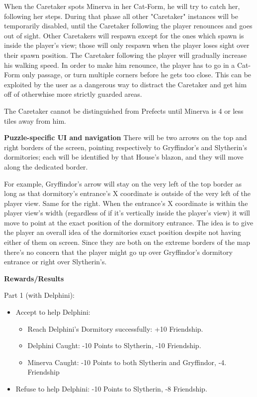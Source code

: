 When the Caretaker spots Minerva in her Cat-Form, he will try to catch her, following her steps. During that phase all other "Caretaker" instances will be temporarily disabled, until the Caretaker following the player renounces and goes out of sight. Other Caretakers will respawn except for the ones which spawn is inside the player's view; those will only respawn when the player loses sight over their spawn position. The Caretaker following the player will gradually increase his walking speed. In order to make him renounce, the player has to go in a Cat-Form only passage, or turn multiple corners before he gets too close. This can be exploited by the user as a dangerous way to distract the Caretaker and get him off of otherwhise more strictly guarded areas.

The Caretaker cannot be distinguished from Prefects until Minerva is 4 or less tiles away from him.

\textbf{Puzzle-specific UI and navigation}
There will be two arrows on the top and right borders of the screen, pointing respectively to Gryffindor's and Slytherin's dormitories; each will be identified by that House's blazon, and they will move along the dedicated border.

For example, Gryffindor's arrow will stay on the very left of the top border as long as that dormitory's entrance's X coordinate is outside of the very left of the player view. Same for the right. When the entrance's X coordinate is within the player view's width (regardless of if it's vertically inside the player's view) it will move to point at the exact position of the dormitory entrance. The idea is to give the player an overall idea of the dormitories exact position despite not having either of them on screen. Since they are both on the extreme borders of the map there's no concern that the player might go up over Gryffindor's dormitory entrance or right over Slytherin's.

\textbf{Rewards/Results}

Part 1 (with Delphini):

\begin{itemize}
    \item Accept to help Delphini:
	\begin{itemize}
		\item Reach Delphini's Dormitory successfully: +10 Friendship.
		\item Delphini Caught: -10 Points to Slytherin, -10 Friendship.
		\item Minerva Caught: -10 Points to both Slytherin and Gryffindor, -4. Friendship
	\end{itemize}
	\item Refuse to help Delphini: -10 Points to Slytherin, -8 Friendship.
\end{itemize}

